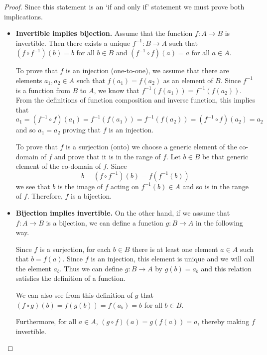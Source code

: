 \documentclass[
]{book}
\theoremstyle{definition}
\theoremstyle{definition}
\theoremstyle{definition}
\theoremstyle{definition}
\theoremstyle{remark}
\begin{document}
\begin{proof}

Since this statement is an `if and only if' statement we must prove both implications.

\begin{itemize}
\item
  \textbf{Invertible implies bijection.} Assume that the function \(f:A \rightarrow B\) is invertible. Then there exists a unique \(f^{-1}:B\rightarrow A\) such that \((f\circ f^{-1})(b)=b\) for all \(b\in B\) and \((f^{-1}\circ f)(a)=a\) for all \(a\in A\).

  To prove that \(f\) is an injection (one-to-one), we assume that there are elements \(a_1, a_2\in A\) such that \(f(a_1)=f(a_2)\) as an element of \(B\). Since \(f^{-1}\) is a function from \(B\) to \(A\), we know that \(f^{-1}(f(a_1))=f^{-1}(f(a_2))\). From the definitions of function composition and inverse function, this implies that \[a_1 = (f^{-1}\circ f)(a_1)= f^{-1}(f(a_1))=f^{-1}(f(a_2))= (f^{-1}\circ f)(a_2)=a_2\] and so \(a_1=a_2\) proving that \(f\) is an injection.

  To prove that \(f\) is a surjection (onto) we choose a generic element of the co-domain of \(f\) and prove that it is in the range of \(f\). Let \(b\in B\) be that generic element of the co-domain of \(f\). Since \[b = (f\circ f^{-1})(b) = f(f^{-1}(b))\] we see that \(b\) is the image of \(f\) acting on \(f^{-1}(b) \in A\) and so is in the range of \(f\). Therefore, \(f\) is a bijection.
\item
  \textbf{Bijection implies invertible.} On the other hand, if we assume that \(f:A\rightarrow B\) is a bijection, we can define a function \(g: B \rightarrow A\) in the following way.

  Since \(f\) is a surjection, for each \(b\in B\) there is at least one element \(a\in A\) such that \(b=f(a)\). Since \(f\) is an injection, this element is unique and we will call the element \(a_b\). Thus we can define \(g:B\rightarrow A\) by \(g(b)=a_b\) and this relation satisfies the definition of a function.

  We can also see from this definition of \(g\) that \((f\circ g)(b)=f(g(b))=f(a_b)=b\) for all \(b\in B\).

  Furthermore, for all \(a\in A\), \((g \circ f)(a) = g(f(a))=a\), thereby making \(f\) invertible.
\end{itemize}

\end{proof}
\end{document}
